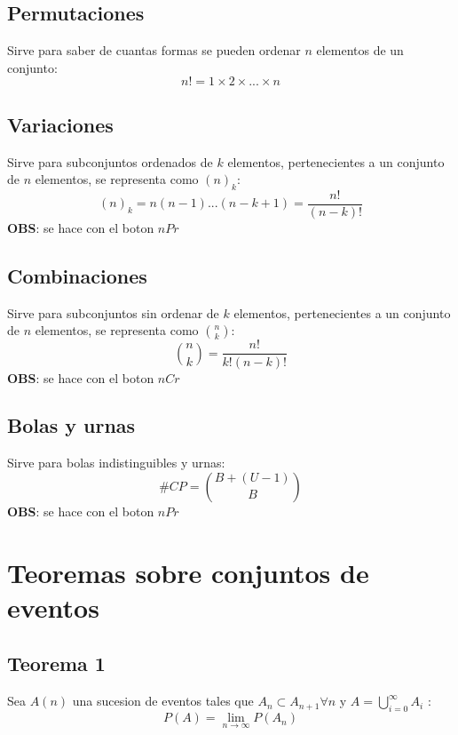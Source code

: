 \documentclass[titlepage,a4paper]{article}
\begin{document}
\subsection{Permutaciones}
Sirve para saber de cuantas formas se pueden ordenar $n$ elementos de un conjunto:
\begin{equation*}
    n! = 1 \times 2 \times ...\times n
\end{equation*}

\subsection{Variaciones}
Sirve para subconjuntos ordenados de $k$ elementos, pertenecientes a un conjunto de $n$ elementos, se representa como $(n)_{k}$:
\begin{equation*}
    (n)_{k} = n(n-1) ... (n-k+1) = \frac{n!}{(n-k)!}
\end{equation*}
\textbf{OBS}: se hace con el boton $nPr$

\subsection{Combinaciones}
Sirve para subconjuntos sin ordenar de $k$ elementos, pertenecientes a un conjunto de $n$ elementos, se representa como $n \choose k$:
\begin{equation*}
    {n \choose k} = \frac{n!}{k!(n-k)!}
\end{equation*}
\textbf{OBS}: se hace con el boton $nCr$

\subsection{Bolas y urnas}
Sirve para bolas indistinguibles y urnas:
\begin{equation*}
    \# CP = {B+(U-1) \choose B}
\end{equation*}
\textbf{OBS}: se hace con el boton $nPr$

\section{Teoremas sobre conjuntos de eventos}

\subsection{Teorema 1}
Sea $A(n)$ una sucesion de eventos tales que $A_{n} \subset A_{n+1} \forall n$ y $A = \bigcup_{i=0}^{\infty} A_{i}$ :
\begin{equation*}
    P(A) = \lim_{n \to \infty } P(A_{n})
\end{equation*}
\end{document}
